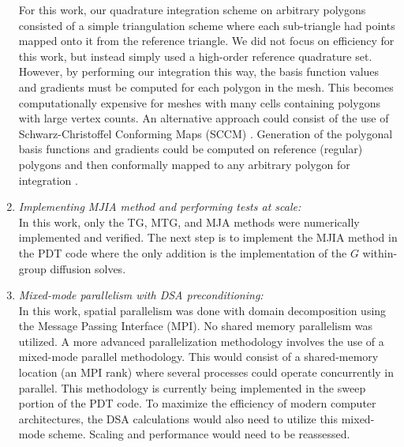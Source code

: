 \begin{enumerate}
For this work, our quadrature integration scheme on arbitrary polygons consisted of a simple triangulation scheme where each sub-triangle had points mapped onto it from the reference triangle. We did not focus on efficiency for this work, but instead simply used a high-order reference quadrature set. However, by performing our integration this way, the basis function values and gradients must be computed for each polygon in the mesh. This becomes computationally expensive for meshes with many cells containing polygons with large vertex counts. An alternative approach could consist of the use of Schwarz-Christoffel Conforming Maps (SCCM) \cite{driscoll2002schwarz,driscoll2005algorithm}. Generation of the polygonal basis functions and gradients could be computed on reference (regular) polygons and then conformally mapped to any arbitrary polygon for integration \cite{natarajan2009numerical}.
\item {\em Implementing MJIA method and performing tests at scale:} \\
In this work, only the TG, MTG, and MJA methods were numerically implemented and verified. The next step is to implement the MJIA method in the PDT code where the only addition is the implementation of the $G$ within-group diffusion solves. 
\item {\em Mixed-mode parallelism with DSA preconditioning:} \\
In this work, spatial parallelism was done with domain decomposition using the Message Passing Interface (MPI). No shared memory parallelism was utilized. A more advanced parallelization methodology involves the use of a mixed-mode parallel methodology. This would consist of a shared-memory location (an MPI rank) where several processes could operate concurrently in parallel. This methodology is currently being implemented in the sweep portion of the PDT code. To maximize the efficiency of modern computer architectures, the DSA calculations would also need to utilize this mixed-mode scheme. Scaling and performance would need to be reassessed.
\end{enumerate}